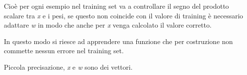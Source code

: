 Cioè per ogni esempio nel training set va a controllare il segno del
prodotto scalare tra \emph{x} e i pesi, se questo non coincide con il
valore di training è necessario adattare \emph{w} in modo che anche per
\emph{x} venga calcolato il valore corretto.

In questo modo si riesce ad apprendere una funzione che per costruzione
non commette nessun errore nel training set.

Piccola precisazione, \emph{x} e \emph{w} sono dei vettori.
